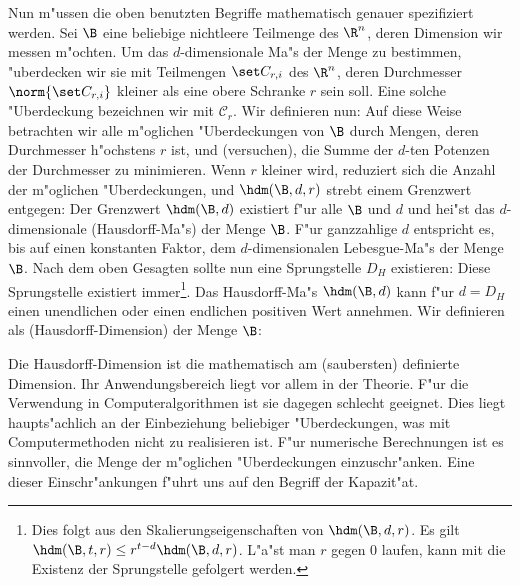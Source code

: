 Nun m"ussen die oben benutzten Begriffe mathematisch genauer spezifiziert werden. 
Sei $\B$ eine beliebige nichtleere Teilmenge des $\R^n$, deren Dimension wir messen m"ochten. Um das
$d$-dimensionale Ma"s  der Menge zu bestimmen, "uberdecken wir sie mit Teilmengen 
$\set C_{r,i}$ des $\R^n$, deren Durchmesser $\norm{\set C_{r,i}}$ kleiner als eine obere
Schranke $r$ sein soll. Eine solche "Uberdeckung bezeichnen wir mit $\mathcal
C_r$. Wir definieren nun:
Auf diese Weise betrachten wir alle m"oglichen "Uberdeckungen von $\B$ durch Mengen,
deren Durchmesser h"ochstens $r$ ist, und \naja(versuchen), die Summe der $d$-ten Potenzen der
Durchmesser zu minimieren. Wenn $r$ kleiner wird, reduziert sich die Anzahl der
m"oglichen "Uberdeckungen, und $\hdm(\B,d,r)$ strebt einem Grenzwert entgegen:
Der Grenzwert $\hdm(\B,d)$ existiert f"ur alle $\B$ und $d$ und hei"st das
$d$-dimensionale \begriff(Haus\-dorff-Ma"s) der Menge $\B$. F"ur ganzzahlige $d$ entspricht
es, bis auf einen konstanten Faktor, dem $d$-dimensionalen Lebesgue-Ma"s der Menge
$\B$. Nach dem oben Gesagten sollte nun eine Sprungstelle $D_H$ existieren:
Diese Sprungstelle existiert immer\footnote{Dies folgt aus den Skalierungseigenschaften von $\hdm(\B,d,r)$. Es gilt
$\hdm(\B,t,r)\leq r^{t-d}\hdm(\B,d,r)$. L"a"st man $r$ gegen 0 laufen, kann
mit  die Existenz der Sprungstelle gefolgert werden. }.
Das Hausdorff-Ma"s $\hdm(\B,d)$ kann f"ur
$d=D_H$ einen unendlichen oder einen endlichen positiven Wert  annehmen. Wir definieren als
\begriff(Hausdorff-Dimension) der Menge $\B$:


Die Hausdorff-Dimension ist die mathematisch am \naja(saubersten) definierte Dimension. Ihr
Anwendungsbereich liegt vor allem in der Theorie. F"ur die Verwendung in
Computeralgorithmen ist sie dagegen schlecht geeignet. Dies liegt haupts"achlich an
der Einbeziehung beliebiger "Uberdeckungen, was mit Computermethoden nicht zu realisieren
ist. F"ur numerische Berechnungen ist es sinnvoller, die Menge der m"oglichen
"Uberdeckungen einzuschr"anken. Eine dieser Einschr"ankungen f"uhrt uns auf den Begriff
der Kapazit"at.



